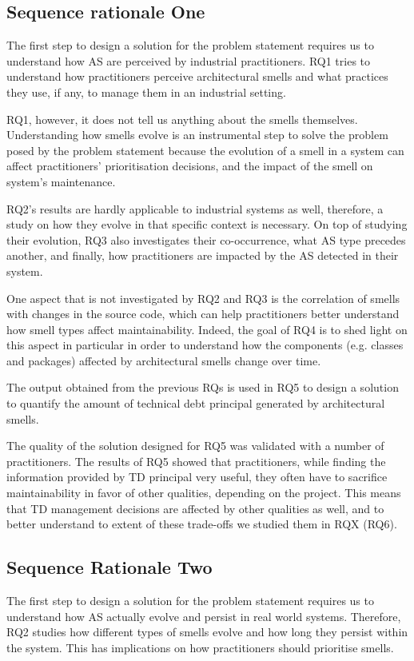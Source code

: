\subsection{Sequence rationale One}
The first step to design a solution for the problem statement requires us to understand how AS are perceived by industrial practitioners.
RQ1 tries to understand how practitioners perceive architectural smells and what practices they use, if any, to manage them in an industrial setting.

RQ1, however, it does not tell us anything about the smells themselves. Understanding how smells evolve is an instrumental step to solve the problem posed by the problem statement because the evolution of a smell in a system can affect practitioners' prioritisation decisions, and the impact of the smell on system's maintenance.

RQ2's results are hardly applicable to industrial systems as well, therefore, a study on how they evolve in that specific context is necessary.
On top of studying their evolution, RQ3 also investigates their co-occurrence, what AS type precedes another, and finally, how practitioners are impacted by the AS detected in their system.

One aspect that is not investigated by RQ2 and RQ3 is the correlation of smells with changes in the source code, which can help practitioners better understand how smell types affect maintainability. Indeed, the goal of RQ4 is to shed light on this aspect in particular in order to understand how the components (e.g. classes and packages) affected by architectural smells change over time.

The output obtained from the previous RQs is used in RQ5 to design a solution to quantify the amount of technical debt principal generated by architectural smells.

The quality of the solution designed for RQ5 was validated with a number of practitioners.
The results of RQ5 showed that practitioners, while finding the information provided by TD principal very useful, they often have to sacrifice maintainability in favor of other qualities, depending on the project.
This means that TD management decisions are affected by other qualities as well, and to better understand to extent of these trade-offs we studied them in RQX (RQ6).


\subsection{Sequence Rationale Two}
The first step to design a solution for the problem statement requires us to understand how AS actually evolve and persist in real world systems.
Therefore, RQ2 studies how different types of smells evolve and how long they persist within the system. This has implications on how practitioners should prioritise smells.

